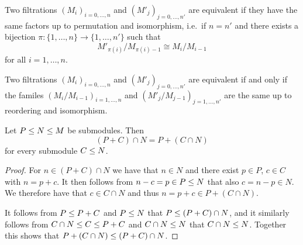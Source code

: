 % 
% 


\begin{definition}
  Two filtrations $(M_i)_{i=0, \dotsc, n}$ and $(M'_j)_{j=0, \dotsc, n'}$ are equivalent if they have the same factors up to permutation and isomorphism, i.e.\ if $n = n'$ and there exists a bijection $\pi \colon \{1, \dotsc, n\} \to \{1, \dotsc, n'\}$ such that
  \[
          M'_{\pi(i)} / M_{\pi(i)-1}
    \cong M_i / M_{i-1}
  \]
  for all $i = 1, \dotsc, n$.
\end{definition}


\begin{remark}
  Two filtrations $(M_i)_{i=0, \dotsc, n}$ and $(M'_j)_{j=0, \dotsc, n'}$ are equivalent if and only if the familes $(M_i/M_{i-1})_{i=1, \dotsc, n}$ and $(M'_j/M_{j-1})_{j=1, \dotsc, n'}$ are the same up to reordering and isomorphism.
\end{remark}




\begin{lemma}
  \label{lemma: modularity of submodule lattice}
  Let $P \leq N \leq M$ be submodules.
  Then
  \[
      (P + C) \cap N
    = P + (C \cap N)
  \]
  for every submodule $C \leq N$.
\end{lemma}


\begin{proof}
  For $n \in (P + C) \cap N$ we have that $n \in N$ and there exist $p \in P$, $c \in C$ with $n = p + c$.
  It then follows from $n - c = p \in P \leq N$ that also $c = n - p \in N$.
  We therefore have that $c \in C \cap N$ and thus $n = p + c \in P + (C \cap N)$.
  
  It follows from $P \leq P + C$ and $P \leq N$ that $P \leq (P + C) \cap N$, and it similarly follows from $C \cap N \leq C \leq P + C$ and $C \cap N \leq N$ that $C \cap N \leq N$.
  Together this shows that $P + (C \cap N) \leq (P + C) \cap N$.
\end{proof}


